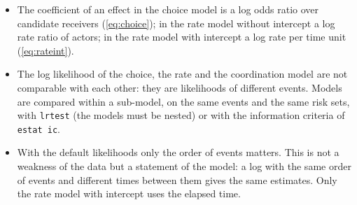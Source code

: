 \begin{itemize}[nosep]
  \item The coefficient of an effect in the choice model is a log odds ratio over candidate receivers (\ref{eq:choice}); in the rate model without intercept a log rate ratio of actors; in the rate model with intercept a log rate per time unit (\ref{eq:rateint}).
  \item The log likelihood of the choice, the rate and the coordination model are not comparable with each other: they are likelihoods of different events. Models are compared within a sub-model, on the same events and the same risk sets, with \texttt{lrtest} (the models must be nested) or with the information criteria of \texttt{estat ic}.
  \item With the default likelihoods only the order of events matters. This is not a weakness of the data but a statement of the model: a log with the same order of events and different times between them gives the same estimates. Only the rate model with intercept uses the elapsed time.
\end{itemize}
